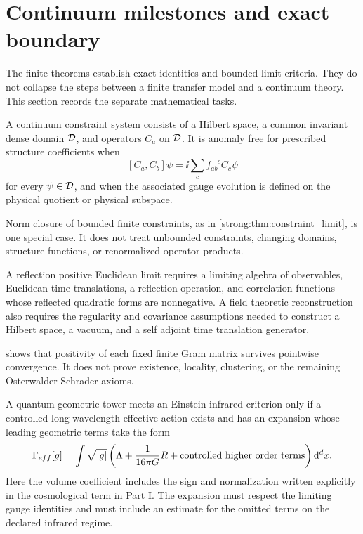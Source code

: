 \section{Continuum milestones and exact boundary}\label{strong:section:014}\label{strong:sec:boundary}

The finite theorems establish exact identities and bounded limit criteria. They do not collapse the steps between a finite transfer model and a continuum theory. This section records the separate mathematical tasks.

\begin{definition}\label{strong:definition:011}\label{strong:def:anomaly_free_continuum}
A continuum constraint system consists of a Hilbert space, a common invariant dense domain \(\Dcal\), and operators \(C_a\) on \(\Dcal\). It is anomaly free for prescribed structure coefficients when
\[
[C_a,C_b]\psi
=
\ii\sum_cf_{ab}^{\phantom{ab}c}C_c\psi
\]
for every \(\psi\in\Dcal\), and when the associated gauge evolution is defined on the physical quotient or physical subspace.
\end{definition}

Norm closure of bounded finite constraints, as in \cref{strong:thm:constraint_limit}, is one special case. It does not treat unbounded constraints, changing domains, structure functions, or renormalized operator products.

\begin{definition}\label{strong:definition:012}\label{strong:def:reflection_positive_limit}
A reflection positive Euclidean limit requires a limiting algebra of observables, Euclidean time translations, a reflection operation, and correlation functions whose reflected quadratic forms are nonnegative. A field theoretic reconstruction also requires the regularity and covariance assumptions needed to construct a Hilbert space, a vacuum, and a self adjoint time translation generator.
\end{definition}

 shows that positivity of each fixed finite Gram matrix survives pointwise convergence. It does not prove existence, locality, clustering, or the remaining Osterwalder Schrader axioms.

\begin{definition}\label{strong:definition:013}\label{strong:def:einstein_criterion}
A quantum geometric tower meets an Einstein infrared criterion only if a controlled long wavelength effective action exists and has an expansion whose leading geometric terms take the form
\[
\Gamma_{\rm eff}[g]
=
\int
\sqrt{\abs g}
\left(
\Lambda
+
\frac{1}{16\pi G}R
+
\text{controlled higher order terms}
\right)
\dd^dx.
\]
Here the volume coefficient includes the sign and normalization written explicitly in the cosmological term in Part I. The expansion must respect the limiting gauge identities and must include an estimate for the omitted terms on the declared infrared regime.
\end{definition}

